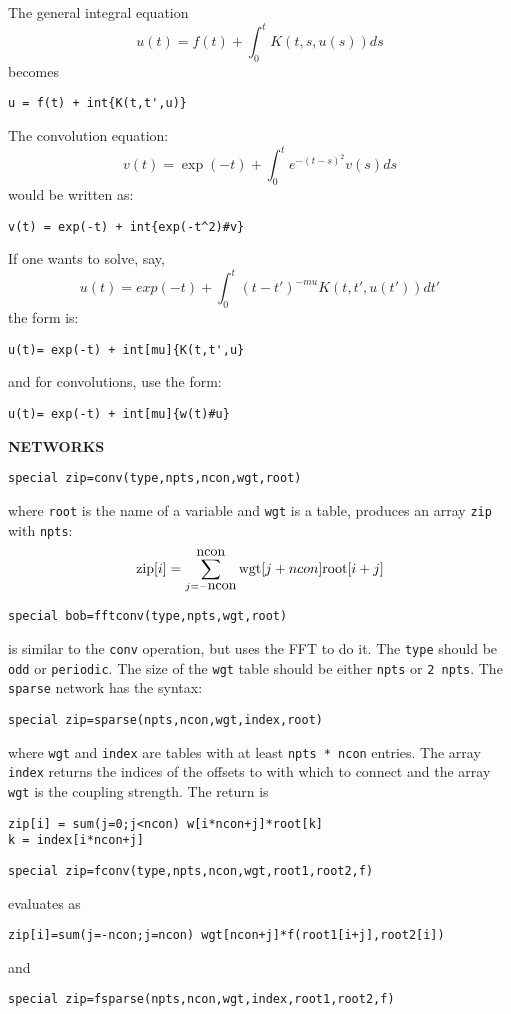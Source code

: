 The general integral equation
\[
	u(t)=f(t)+\int_0^t K(t,s,u(s))ds
\]
becomes
\begin{verbatim}
u = f(t) + int{K(t,t',u)}
\end{verbatim}
The convolution equation:
\[
 v(t) = \exp(-t) + \int_0^t e^{-(t-s)^2}v(s) ds
\]
would be written as:
\begin{verbatim}
v(t) = exp(-t) + int{exp(-t^2)#v}
\end{verbatim}
If one wants to solve, say,
\[
 u(t) = exp(-t) + \int^t_0 (t-t')^{-mu} K(t,t',u(t'))dt'
\]
the form is:
\begin{verbatim}
u(t)= exp(-t) + int[mu]{K(t,t',u}
\end{verbatim}
and for convolutions, use the form:
\begin{verbatim}
u(t)= exp(-t) + int[mu]{w(t)#u}
\end{verbatim}
\noindent
{\bf NETWORKS}
\begin{verbatim}
special zip=conv(type,npts,ncon,wgt,root)
\end{verbatim}
where {\tt root} is the name of a variable and {\tt wgt} is a table,
produces an array {\tt zip} with {\tt npts}:
\[
\hbox{zip}[i] =\sum_{j=-\hbox{ncon}}^{\hbox{ncon}}\hbox{wgt}[j+ncon]
\hbox{root}[i+j] 
\]
\begin{verbatim}
special bob=fftconv(type,npts,wgt,root)
\end{verbatim}
is similar to the {\tt conv} operation, but uses the FFT to do it. The {\tt type} should be {\tt odd} or {\tt periodic}. The size of the {\tt wgt} table should be either {\tt npts} or {\tt 2 npts}.
The {\tt sparse} network has the syntax:
\begin{verbatim}
special zip=sparse(npts,ncon,wgt,index,root)
\end{verbatim}
where {\tt wgt} and {\tt index} are tables with at least {\tt npts *
ncon} entries.   The array {\tt index} returns the indices of the
offsets to with which to connect and the array {\tt wgt} is the
coupling strength. The return is
\begin{verbatim}
zip[i] = sum(j=0;j<ncon) w[i*ncon+j]*root[k]
k = index[i*ncon+j] 
\end{verbatim}
\begin{verbatim}
special zip=fconv(type,npts,ncon,wgt,root1,root2,f)
\end{verbatim}
evaluates as 
\begin{verbatim}
zip[i]=sum(j=-ncon;j=ncon) wgt[ncon+j]*f(root1[i+j],root2[i])
\end{verbatim}
and 
\begin{verbatim}
special zip=fsparse(npts,ncon,wgt,index,root1,root2,f)
\end{verbatim}
